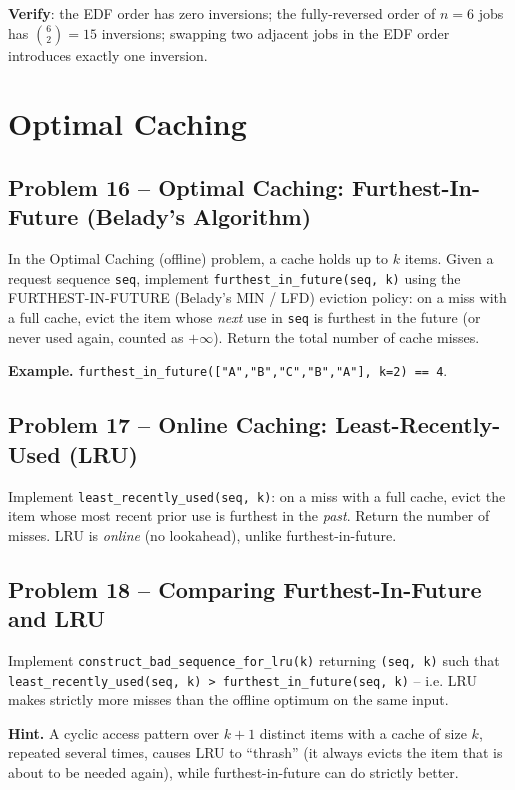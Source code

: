 \documentclass[11pt]{article}
\begin{document}
\textbf{Verify}: the EDF order has zero inversions; the fully-reversed order of $n=6$ jobs
has $\binom{6}{2}=15$ inversions; swapping two adjacent jobs in the EDF order introduces
exactly one inversion.

\newpage
\section{Optimal Caching}

\subsection*{Problem 16 -- Optimal Caching: Furthest-In-Future (Belady's Algorithm)}

In the Optimal Caching (offline) problem, a cache holds up to $k$ items. Given a request
sequence \texttt{seq}, implement \texttt{furthest\_in\_future(seq, k)} using the
FURTHEST-IN-FUTURE (Belady's MIN / LFD) eviction policy: on a miss with a full cache,
evict the item whose \emph{next} use in \texttt{seq} is furthest in the future (or never
used again, counted as $+\infty$). Return the total number of cache misses.

\textbf{Example.} \texttt{furthest\_in\_future(["A","B","C","B","A"], k=2) == 4}.

\subsection*{Problem 17 -- Online Caching: Least-Recently-Used (LRU)}

Implement \texttt{least\_recently\_used(seq, k)}: on a miss with a full cache, evict the
item whose most recent prior use is furthest in the \emph{past}. Return the number of
misses. LRU is \emph{online} (no lookahead), unlike furthest-in-future.

\subsection*{Problem 18 -- Comparing Furthest-In-Future and LRU}

Implement \texttt{construct\_bad\_sequence\_for\_lru(k)} returning \texttt{(seq, k)} such
that \texttt{least\_recently\_used(seq, k) > furthest\_in\_future(seq, k)} -- i.e. LRU
makes strictly more misses than the offline optimum on the same input.

\textbf{Hint.} A cyclic access pattern over $k+1$ distinct items with a cache of size $k$,
repeated several times, causes LRU to ``thrash'' (it always evicts the item that is about
to be needed again), while furthest-in-future can do strictly better.
\end{document}
